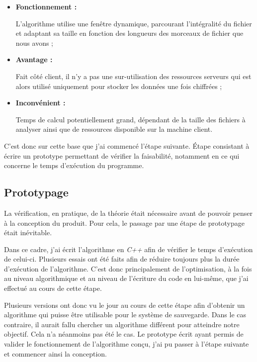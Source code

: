 \documentclass[a4paper,10pt, twoside]{report}
\begin{document}
\begin{spacing}{1.2}
\begin{itemize}
 \item \textbf{Fonctionnement :}
 
 L'algorithme utilise une fenêtre dynamique,
 parcourant l'intégralité du fichier et adaptant sa taille en fonction
 des longueurs des morceaux de fichier que nous avons ;
 
 \item \textbf{Avantage :}
 
 Fait côté client, il n'y a pas une
 sur-utilisation des ressources serveurs qui est alors utilisé uniquement
 pour stocker les données une fois chiffrées ;
 
 \item \textbf{Inconvénient :}
 
 Temps de calcul potentiellement grand,
 dépendant de la taille des fichiers à analyser ainsi que de ressources
 disponible sur la machine client.
\end{itemize}

C'est donc sur cette base que j'ai commencé l'étape suivante. Étape 
consistant à écrire un prototype permettant de vérifier la faisabilité,
notamment en ce qui concerne le temps d'exécution du programme.

\subsection{Prototypage}

La vérification, en pratique, de la théorie était nécessaire avant de
pouvoir penser à la conception du produit. Pour cela, le passage par une
étape de prototypage était inévitable.

Dans ce cadre, j'ai écrit l'algorithme en \textit{C++} afin de vérifier
le temps d'exécution de celui-ci. Plusieurs essais ont été faits afin de
réduire toujours plus la durée d'exécution de l'algorithme. C'est donc
principalement de l'optimisation, à la fois au niveau algorithmique et
au niveau de l'écriture du code en lui-même, que j'ai effectué  au
cours de cette étape.

Plusieurs versions ont donc vu le jour au cours de cette étape afin d'obtenir
un algorithme qui puisse être utilisable pour le système de sauvegarde. Dans
le cas contraire, il aurait fallu chercher un algorithme différent pour
atteindre notre objectif. Cela n'a néanmoins pas été le cas. Le
prototype écrit ayant permis de valider le fonctionnement de l'algorithme
conçu, j'ai pu passer à l'étape suivante et commencer ainsi la
conception.


\end{spacing}
\end{document}
